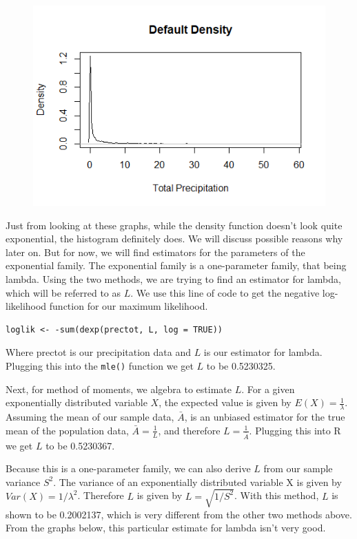 \documentclass[12pt, a4paper, oneside]{report}
\begin{document}
\begin{figure}[h]
  \centering
  \includegraphics[width=0.8\linewidth]{expDensityDefault.png}
\end{figure}

\newpage
Just from looking at these graphs, while the density function doesn’t look quite exponential, the histogram definitely does. We will discuss possible reasons why later on. But for now, we will find estimators for the parameters of the exponential family.
The exponential family is a one-parameter family, that being lambda. Using the two methods, we are trying to find an estimator for lambda, which will be referred to as \(L\).
We use this line of code to get the negative log-likelihood function for our maximum likelihood.

\begin{lstlisting}
loglik <- -sum(dexp(prectot, L, log = TRUE))
\end{lstlisting}

Where prectot is our precipitation data and \(L\) is our estimator for lambda.
Plugging this into the \lstinline{mle()} function we get \(L\) to be 0.5230325.


Next, for method of moments, we algebra to estimate \(L\).
For a given exponentially distributed variable \(X\), the expected value is given by \(E(X) = \frac{1}{\lambda}\). Assuming the mean of our sample data, \(\bar{A}\), is an unbiased estimator for the true mean of the population data, \(\bar{A} = \frac{1}{L}\), and therefore \(L = \frac{1}{\bar{A}}\).
Plugging this into R we get \(L\) to be 0.5230367.


Because this is a one-parameter family, we can also derive \(L\) from our sample variance \(S^2\). The variance of an exponentially distributed variable X is given by \(Var(X) = 1 / \lambda^2\). Therefore \(L\) is given by \(L = \sqrt{1 / S^2}\).
With this method, \(L\) is shown to be 0.2002137, which is very different from the other two methods above. From the graphs below, this particular estimate for lambda isn't very good. 
\end{document}
